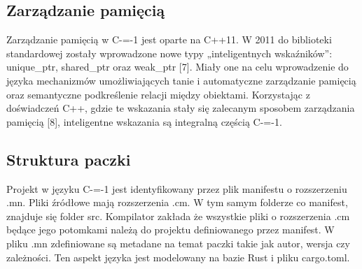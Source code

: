 \subsection{Zarządzanie pamięcią}
Zarządzanie pamięcią w C-=-1 jest oparte na C++11. W 2011 do biblioteki standardowej zostały wprowadzone nowe typy „inteligentnych wskaźników”: unique\_ptr, shared\_ptr oraz weak\_ptr [7]. Miały one na celu wprowadzenie do języka mechanizmów umożliwiających tanie i automatyczne zarządzanie pamięcią oraz semantyczne podkreślenie relacji między obiektami.
Korzystając z doświadczeń C++, gdzie te wskazania stały się zalecanym sposobem zarządzania pamięcią [8], inteligentne wskazania są integralną częścią C-=-1.
\subsection{Struktura paczki}\label{struktura_paczki}
Projekt w języku C-=-1 jest identyfikowany przez plik manifestu o rozszerzeniu .mn. Pliki źródłowe mają rozszerzenia .cm. W tym samym folderze co manifest, znajduje się folder src. Kompilator zakłada że wszystkie pliki o rozszerzenia .cm będące jego potomkami należą do projektu definiowanego przez manifest.
W pliku .mn zdefiniowane są metadane na temat paczki takie jak autor, wersja czy zależności. Ten aspekt języka jest modelowany na bazie Rust i pliku cargo.toml.
